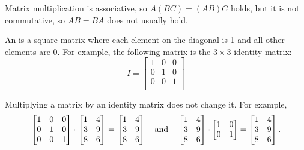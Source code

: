 Matrix multiplication is associative,
so $A(BC)=(AB)C$ holds,
but it is not commutative,
so $AB = BA$ does not usually hold.


An  is a square matrix
where each element on the diagonal is 1
and all other elements are 0.
For example, the following matrix
is the $3 \times 3$ identity matrix:
\[
    I = \begin{bmatrix}
        1 & 0 & 0 \\
        0 & 1 & 0 \\
        0 & 0 & 1 \\
    \end{bmatrix}
\]

\begin{samepage}
    Multiplying a matrix by an identity matrix
    does not change it. For example,
    \[
        \begin{bmatrix}
            1 & 0 & 0 \\
            0 & 1 & 0 \\
            0 & 0 & 1 \\
        \end{bmatrix}
        \cdot
        \begin{bmatrix}
            1 & 4 \\
            3 & 9 \\
            8 & 6 \\
        \end{bmatrix}
        =
        \begin{bmatrix}
            1 & 4 \\
            3 & 9 \\
            8 & 6 \\
        \end{bmatrix} \hspace{10px} \textrm{and} \hspace{10px}
        \begin{bmatrix}
            1 & 4 \\
            3 & 9 \\
            8 & 6 \\
        \end{bmatrix}
        \cdot
        \begin{bmatrix}
            1 & 0 \\
            0 & 1 \\
        \end{bmatrix}
        =
        \begin{bmatrix}
            1 & 4 \\
            3 & 9 \\
            8 & 6 \\
        \end{bmatrix}.
    \]
\end{samepage}

